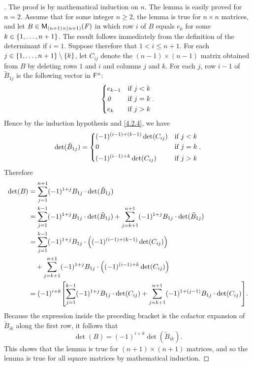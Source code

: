 \begin{proof}[]
  The proof is by mathematical induction on \(n\).
  The lemma is easily proved for \(n = 2\).
  Assume that for some integer \(n \geq 2\), the lemma is true for \(n \times n\) matrices, and let \(B \in \mathsf{M}_{{(n + 1)} \times (n + 1)}({\mathit{F}})\) in which row \(i\) of \(B\) equals \(e_k\) for some \(k \in \left\lbrace1, \dots, n + 1\right\rbrace\).
  The result follows immediately from the definition of the determinant if \(i = 1\).
  Suppose therefore that \(1 < i \leq n + 1\).
  For each \(j \in \left\lbrace1, \dots, n + 1\right\rbrace \setminus \left\lbrace k\right\rbrace\), let \(C_{i j}\) denote the \((n - 1) \times (n - 1)\) matrix obtained from \(B\) by deleting rows \(1\) and \(i\) and columns \(j\) and \(k\).
  For each \(j\), row \(i - 1\) of \(\tilde{B}_{1 j}\) is the following vector in \(\mathsf{F}^n\):
  \[
    \begin{dcases}
      e_{k - 1} & \text{if } j < k \\
      \mathit{0}       & \text{if } j = k \\
      e_k       & \text{if } j > k
    \end{dcases}.
  \]
  Hence by the induction hypothesis and \cref{4.2.4}, we have
  \[
    \det(\tilde{B}_{1 j}) = \begin{dcases}
      (-1)^{(i - 1) + (k - 1)} \det(C_{i j}) & \text{if } j < k \\
      0                                      & \text{if } j = k \\
      (-1)^{(i - 1) + k} \det(C_{i j})       & \text{if } j > k
    \end{dcases}.
  \]
  Therefore
  \begin{align*}
    \det(B) & = \sum_{j = 1}^{n + 1} (-1)^{1 + j} B_{1 j} \cdot \det(\tilde{B}_{1 j})                                                                                      \\
            & = \sum_{j = 1}^{k - 1} (-1)^{1 + j} B_{1 j} \cdot \det(\tilde{B}_{1 j}) + \sum_{j = k + 1}^{n + 1} (-1)^{1 + j} B_{1 j} \cdot \det(\tilde{B}_{1 j})          \\
            & = \sum_{j = 1}^{k - 1} (-1)^{1 + j} B_{1 j} \cdot \pa{(-1)^{(i - 1) + (k - 1)} \det(C_{i j})}                                                                \\
            & \quad + \sum_{j = k + 1}^{n + 1} (-1)^{1 + j} B_{1 j} \cdot \pa{(-1)^{(i - 1) + k} \det(C_{i j})}                                                            \\
            & = (-1)^{i + k} \br{\sum_{j = 1}^{k - 1} (-1)^{1 + j} B_{1 j} \cdot \det(C_{i j}) + \sum_{j = k + 1}^{n + 1} (-1)^{1 + (j - 1)} B_{1 j} \cdot \det(C_{i j})}.
  \end{align*}
  Because the expression inside the preceding bracket is the cofactor expansion of \(\tilde{B}_{i k}\) along the first row, it follows that
  \[
    \det(B) = (-1)^{i + k} \det(\tilde{B}_{i k}).
  \]
  This shows that the lemma is true for \((n + 1) \times (n + 1)\) matrices, and so the lemma is true for all square matrices by mathematical induction.
\end{proof}
